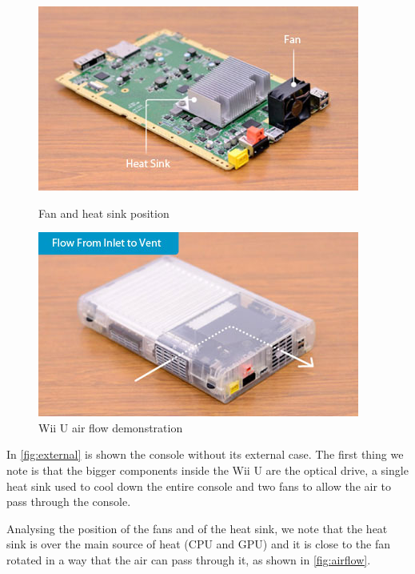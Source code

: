 \documentclass[11pt,a4paper,titlepage]{article}
\begin{document}
		\begin{figure}[ht]
			\centering
			\begin{minipage}{0.45\textwidth}
				\centering
				\includegraphics[width=\textwidth]{fan-heatsink.jpeg}
				\caption{Fan and heat sink position}
				\label{fig:fan-heatsink}
			\end{minipage}
			\hspace{0.5cm}
			\begin{minipage}{0.45\textwidth}
				\centering
				\includegraphics[width=\textwidth]{air_flow.jpeg}
				\caption{Wii U air flow demonstration}
				\label{fig:airflow}
			\end{minipage}
		\end{figure}

		In \autoref{fig:external} is shown the console without its external case.
		The first thing we note is that the bigger components inside the Wii U are the optical drive, a single heat sink used to cool down the entire console and two fans to allow the air to pass through the console.

		Analysing the position of the fans and of the heat sink, we note that the heat sink is over the main source of heat (CPU and GPU) and it is close to the fan rotated in a way that the air can pass through it, as shown in \autoref{fig:airflow}.
\end{document}
